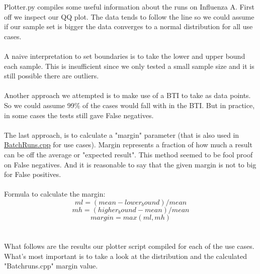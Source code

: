 \documentclass[a4paper]{article}
\begin{document}
\noindent Plotter.py compiles some useful information about the runs on Influenza A. First off we inspect our QQ plot. The data tends to follow the line so we could assume if our sample set is bigger the data converges to a normal distribution for all use cases.
\\
\\
A naive interpretation  to set boundaries  is to take the lower and upper bound each sample. This is insufficient since we only tested a small sample size and it is still possible there are outliers.
\\
\\
Another approach we attempted is to make use of a BTI to take as data points. So we could assume 99\% of the cases would fall with in the BTI. But in practice, in some cases the tests still gave False negatives.
\\
\\
The last approach, is to calculate a "margin" parameter (that is also used in \href{https://github.com/RobbeHeirman/Episim/blob/master/test/cpp/gtester/BatchRuns.cpp}{BatchRuns.cpp} for use cases).
Margin represents a fraction of how much a result can be off the average or "expected result".
This method seemed to be fool proof on False negatives. And it is reasonable to say that the given margin is not to big for False positives.\\\\
Formula to calculate the margin:\\

\[ml = (mean -lower_bound) / mean\]
\[mh = (higher_bound - mean) / mean \]
\[margin = max(ml,mh)\]
\\
\\
What follows are the results our plotter script compiled for each of the use cases. What's most important is to take a look at the distribution and the calculated "Batchruns.cpp" margin value.
\pagebreak
\end{document}
